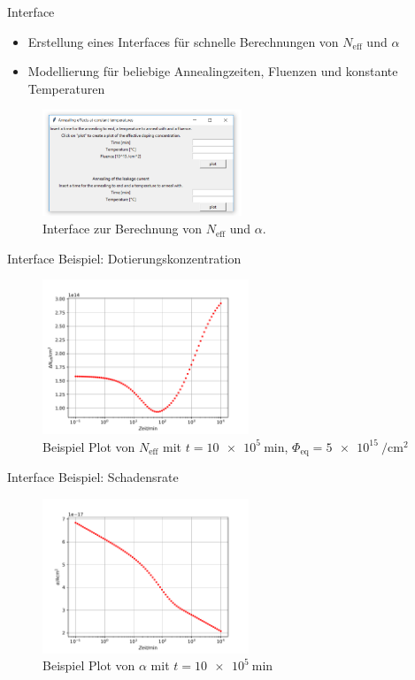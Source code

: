 \documentclass[aspectratio=1610, 9pt]{beamer}
\begin{document}
\begin{frame}{Interface}
  \begin{itemize}
    \item Erstellung eines Interfaces für schnelle Berechnungen von $N_{\mathrm{eff}}$ und $\alpha$
    \item Modellierung für beliebige Annealingzeiten, Fluenzen und konstante Temperaturen
  \end{itemize}
  \begin{figure}
      \includegraphics[width=0.53\textwidth]{images/interface.PNG}
  \caption{Interface zur Berechnung von $N_{\mathrm{eff}}$ und $\alpha$.}
  \end{figure}
\end{frame}

\begin{frame}{Interface Beispiel: Dotierungskonzentration}
  \begin{figure}
    \includegraphics[width=0.55\textwidth]{images/interface_n_eff.PDF}
    \caption{Beispiel Plot von $N_{\mathrm{eff}}$ mit $t = \SI{10e5}{\minute}$, $\Phi_{\mathrm{eq}}= \SI{5e15}{\per\centi\meter\squared}$}
  \end{figure}
\end{frame}

\begin{frame}{Interface Beispiel: Schadensrate}
  \begin{figure}
    \includegraphics[width=0.55\textwidth]{images/interface_damage.PDF}
    \caption{Beispiel Plot von $\alpha$ mit $t = \SI{10e5}{\minute}$}
  \end{figure}
\end{frame}
\end{document}
